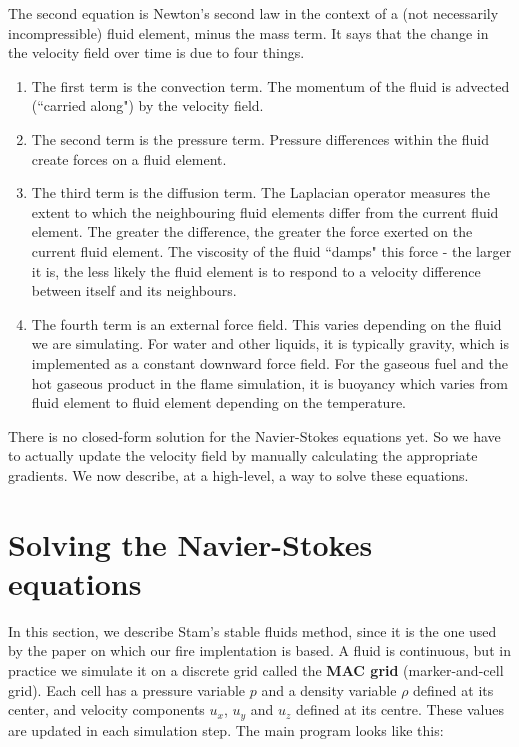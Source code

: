 \documentclass[a4paper]{report}
\begin{document}
The second equation is Newton's second law in the context of a (not necessarily incompressible) fluid element, minus the mass term. It says that the change in the velocity field over time is due to four things.

\begin{enumerate}
  \item The first term is the convection term. The momentum of the fluid is advected (``carried along") by the velocity field.
  \item The second term is the pressure term. Pressure differences within the fluid create forces on a fluid element.
  \item The third term is the diffusion term. The Laplacian operator measures the extent to which the neighbouring fluid elements differ from the current fluid element. The greater the difference, the greater the force exerted on the current fluid element. The viscosity of the fluid ``damps" this force - the larger it is, the less likely the fluid element is to respond to a velocity difference between itself and its neighbours.
  \item The fourth term is an external force field. This varies depending on the fluid we are simulating. For water and other liquids, it is typically gravity, which is implemented as a constant downward force field. For the gaseous fuel and the hot gaseous product in the flame simulation, it is buoyancy which varies from fluid element to fluid element depending on the temperature.
\end{enumerate}

There is no closed-form solution for the Navier-Stokes equations yet. So we have to actually update the velocity field by manually calculating the appropriate gradients. We now describe, at a high-level, a way to solve these equations.

\section{Solving the Navier-Stokes equations}

In this section, we describe Stam's stable fluids method, since it is the one used by the paper on which our fire implentation is based. A fluid is continuous, but in practice we simulate it on a discrete grid called the \textbf{MAC grid} (marker-and-cell grid). Each cell has a pressure variable $p$ and a density variable $\rho$ defined at its center, and velocity components $u_x$, $u_y$ and $u_z$ defined at its centre. These values are updated in each simulation step. The main program looks like this:
\end{document}
